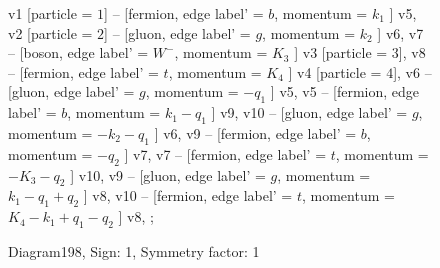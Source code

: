 \documentclass{revtex4}
\begin{document}
\begin{figure}[!htb]
\begin{center}
{    %
v1 [particle = \(1\)] -- [fermion, edge label' = \(b\), momentum = \(k_{1}\) ] v5, 
v2 [particle = \(2\)] -- [gluon, edge label' = \(g\), momentum = \(k_{2}\) ] v6, 
v7 -- [boson, edge label' = \(W^{-}\), momentum = \(K_{3}\) ] v3 [particle = \(3\)], 
v8 -- [fermion, edge label' = \(t\), momentum = \(K_{4}\) ] v4 [particle = \(4\)], 
v6 -- [gluon, edge label' = \(g\), momentum = \(-q_{1}\) ] v5, 
v5 -- [fermion, edge label' = \(b\), momentum = \(k_{1} - q_{1}\) ] v9, 
v10 -- [gluon, edge label' = \(g\), momentum = \(-k_{2} - q_{1}\) ] v6, 
v9 -- [fermion, edge label' = \(b\), momentum = \(-q_{2}\) ] v7, 
v7 -- [fermion, edge label' = \(t\), momentum = \(-K_{3} - q_{2}\) ] v10, 
v9 -- [gluon, edge label' = \(g\), momentum = \(k_{1} - q_{1} + q_{2}\) ] v8, 
v10 -- [fermion, edge label' = \(t\), momentum = \(K_{4} - k_{1} + q_{1} - q_{2}\) ] v8, 
};
\end{center}
\caption{Diagram198, Sign: 1, Symmetry factor: 1}
\end{figure}
\newpage
\end{document}
